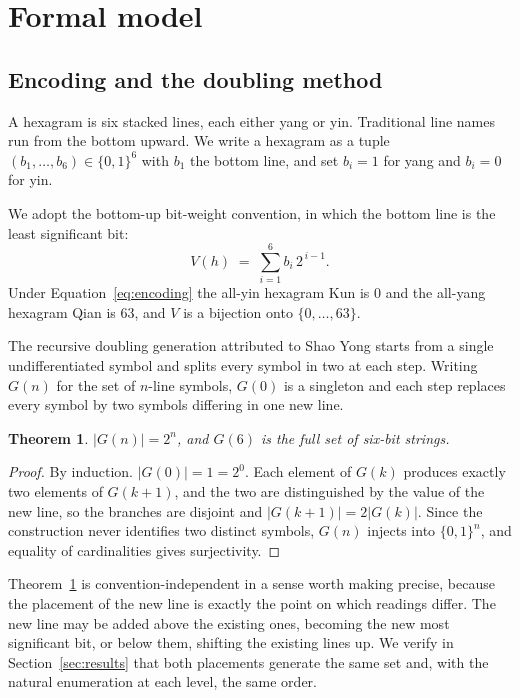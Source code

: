 \documentclass[11pt,a4paper]{article}
\newtheorem{theorem}{Theorem}
\begin{document}
\section{Formal model}
\label{sec:model}

\subsection{Encoding and the doubling method}
\label{sec:encoding}

A hexagram is six stacked lines, each either yang or yin. Traditional line names
run from the bottom upward. We write a hexagram as a tuple
$(b_1,\dots,b_6) \in \{0,1\}^6$ with $b_1$ the bottom line, and set $b_i = 1$ for
yang and $b_i = 0$ for yin.

We adopt the bottom-up bit-weight convention, in which the bottom line is the
least significant bit:
\begin{equation}
V(h) \;=\; \sum_{i=1}^{6} b_i \, 2^{\,i-1}.
\label{eq:encoding}
\end{equation}
Under Equation~\eqref{eq:encoding} the all-yin hexagram Kun is $0$ and the
all-yang hexagram Qian is $63$, and $V$ is a bijection onto $\{0,\dots,63\}$.

The recursive doubling generation attributed to Shao Yong starts from a single
undifferentiated symbol and splits every symbol in two at each step. Writing
$G(n)$ for the set of $n$-line symbols, $G(0)$ is a singleton and each step
replaces every symbol by two symbols differing in one new line.

\begin{theorem}
\label{thm:doubling}
$|G(n)| = 2^n$, and $G(6)$ is the full set of six-bit strings.
\end{theorem}

\begin{proof}
By induction. $|G(0)| = 1 = 2^0$. Each element of $G(k)$ produces exactly two
elements of $G(k+1)$, and the two are distinguished by the value of the new
line, so the branches are disjoint and $|G(k+1)| = 2|G(k)|$. Since the
construction never identifies two distinct symbols, $G(n)$ injects into
$\{0,1\}^n$, and equality of cardinalities gives surjectivity.
\end{proof}

Theorem~\ref{thm:doubling} is convention-independent in a sense worth making
precise, because the placement of the new line is exactly the point on which
readings differ. The new line may be added above the existing ones, becoming the
new most significant bit, or below them, shifting the existing lines up. We
verify in Section~\ref{sec:results} that both placements generate the same set
and, with the natural enumeration at each level, the same order.
\end{document}
